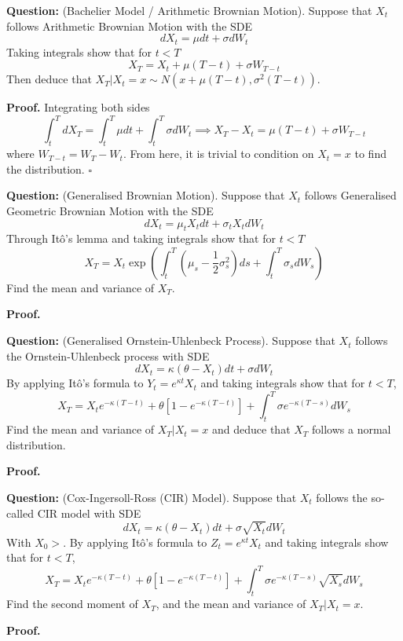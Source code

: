 \documentclass{article}
\begin{document}
\begin{tcolorbox}[colframe=black,colback=gray!5,boxrule=0.5pt]
\textbf{Question:} (Bachelier Model / Arithmetic Brownian Motion). Suppose that $X_t$ follows Arithmetic Brownian Motion with the SDE
$$dX_t = \mu dt + \sigma dW_t$$
Taking integrals show that for $t<T$
$$X_T = X_t + \mu(T-t)+\sigma W_{T-t}$$
Then deduce that $X_T|X_t=x\sim N(x+\mu(T-t),\sigma^2(T-t)).$
\end{tcolorbox}
\textbf{Proof.} Integrating both sides 
$$\int_t^TdX_T = \int_t^T\mu dt + \int_t^T\sigma dW_t \implies X_T-X_t=\mu(T-t)+\sigma W_{T-t}$$
where $W_{T-t} = W_T- W_t$. From here, it is trivial to condition on $X_t=x$ to find the distribution. $\square$


\begin{tcolorbox}[colframe=black,colback=gray!5,boxrule=0.5pt]
\textbf{Question:} (Generalised Brownian Motion). Suppose that $X_t$ follows Generalised Geometric Brownian Motion with the SDE
$$dX_t = \mu_tX_tdt + \sigma_tX_t dW_t$$
Through Itô's lemma and taking integrals show that for $t<T$
$$X_T = X_t\exp\left(\int_t^T\left(\mu_s-\frac{1}{2}\sigma_s^2\right)ds + \int_t^T\sigma_s dW_s\right)$$
Find the mean and variance of $X_T$.
\end{tcolorbox}
\textbf{Proof.}


\begin{tcolorbox}[colframe=black,colback=gray!5,boxrule=0.5pt]
\textbf{Question:} (Generalised Ornstein-Uhlenbeck Process). Suppose that $X_t$ follows the Ornstein-Uhlenbeck process with SDE
$$dX_t = \kappa(\theta-X_t)dt + \sigma dW_t$$
By applying Itô's formula to $Y_t=e^{\kappa t}X_t$ and taking integrals show that for $t<T$,
$$X_T = X_te^{-\kappa(T-t)}+\theta[1-e^{-\kappa(T-t)}] + \int_t^T\sigma e^{-\kappa(T-s)}dW_s$$
Find the mean and variance of $X_T | X_t=x$ and deduce that $X_T$ follows a normal distribution.
\end{tcolorbox}
\textbf{Proof.}


\begin{tcolorbox}[colframe=black,colback=gray!5,boxrule=0.5pt]
\textbf{Question:} (Cox-Ingersoll-Ross (CIR) Model). Suppose that $X_t$ follows the so-called CIR model with SDE
$$dX_t =\kappa(\theta-X_t)dt + \sigma\sqrt{X_t}dW_t$$
With $X_0>$. By applying Itô's formula to $Z_t=e^{\kappa t}X_t$ and taking integrals show that for $t<T$,
$$X_T = X_te^{-\kappa(T-t)}+\theta[1-e^{-\kappa(T-t)}] + \int_t^T\sigma e^{-\kappa(T-s)}\sqrt{X_s}dW_s$$
Find the second moment of $X_T$, and the mean and variance of $X_T | X_t=x$.
\end{tcolorbox}
\textbf{Proof.}
\end{document}
